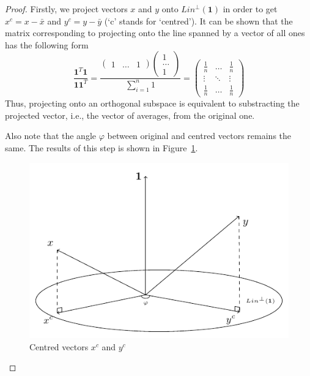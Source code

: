 \documentclass[nobib]{tufte-handout}
\begin{document}
\begin{proof}
Firstly, we project vectors $x$ and $y$ onto $Lin^{\perp}(\mathbf{1})$ in order to get $x^c = x - \bar x$ and $y^c = y - \bar y$
(`c' stands for `centred'). It can be shown that the matrix corresponding to projecting onto the line spanned by a vector of all ones has the following form
\[
\frac{\mathbf{1}^T \mathbf{1}}{\mathbf{1} \mathbf{1}^T} = \frac{\begin{pmatrix} 1 & \ldots & 1 \end{pmatrix} \begin{pmatrix} 1 \\ \ldots \\ 1 \end{pmatrix}}{\sum_{i=1}^n 1} = \begin{pmatrix} \frac{1}{n} & \ldots & \frac{1}{n} \\ \vdots & \ddots & \vdots \\ \frac{1}{n} & \ldots & \frac{1}{n} \end{pmatrix}
\]
Thus, projecting onto an orthogonal subspace is equivalent to substracting the projected vector, i.e., the vector of averages, from the original one.

Also note that the angle $\varphi$ between original and centred vectors remains the same.
The results of this step is shown in Figure~\ref{fig:corr_xyc}.

\begin{figure}
  \centering
  \includegraphics{images/corr_const_cent.pdf}
  \caption{Centred vectors $x^c$ and $y^c$}
  \label{fig:corr_xyc}
\end{figure}


\end{proof}
\end{document}
